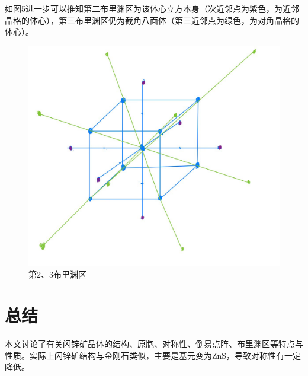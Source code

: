 \documentclass{article}
\begin{document}
如图5进一步可以推知第二布里渊区为该体心立方本身（次近邻点为紫色，为近邻晶格的体心），第三布里渊区仍为截角八面体（第三近邻点为绿色，为对角晶格的体心）。
\begin{figure}[!h]
	
	\centering
	\includegraphics[scale=0.2]{高}
	\caption{\heiti{}第2、3布里渊区}
	
\end{figure}
	\section{总结}
本文讨论了有关闪锌矿晶体的结构、原胞、对称性、倒易点阵、布里渊区等特点与性质。实际上闪锌矿结构与金刚石类似，主要是基元变为ZnS，导致对称性有一定降低。
\end{document}
